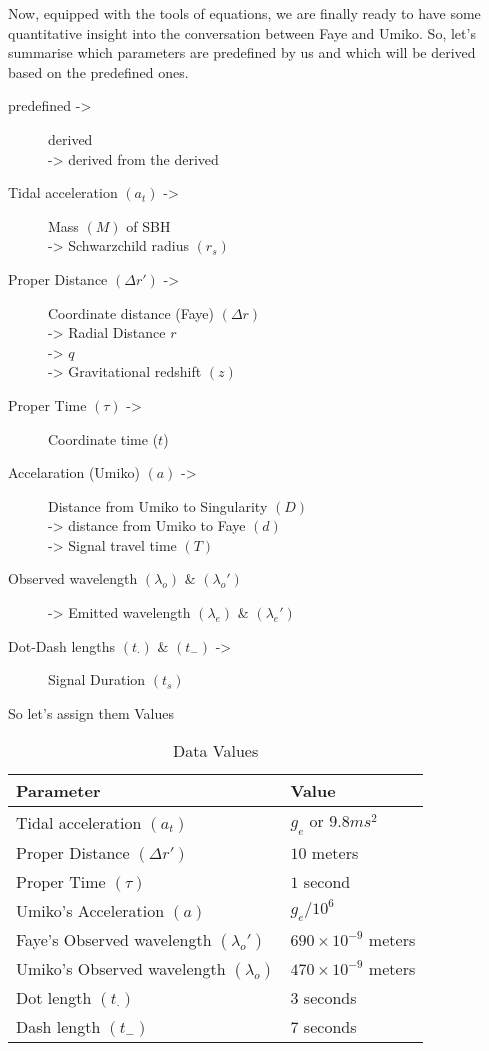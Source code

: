 \documentclass[9pt,a4paper,twocolumn,twoside]{tau-class/tau}
\begin{document}
  Now, equipped with the tools of equations, we are finally ready to have some quantitative insight into the conversation between Faye and Umiko. So, let's summarise which parameters are predefined by us and which will be derived based on the predefined ones.

  \begin{description}
    \item[predefined ->] derived \\-> derived from the derived
    \item[Tidal acceleration \((a_t)\) ->] Mass \((M)\) of SBH \\-> Schwarzchild radius \((r_s)\)
    \item[Proper Distance \((\Delta r')\) ->]  Coordinate distance (Faye) \((\Delta r)\) \\-> Radial Distance \(r\)  \\-> \(q\) \\-> Gravitational redshift \((z)\)
    \item[Proper Time \((\tau)\) ->] Coordinate time (\(t\))
    \item[Accelaration (Umiko) \((a)\) ->] Distance from Umiko to Singularity \((D)\) \\-> distance from Umiko to Faye \((d)\) \\-> Signal travel time \((T)\)
    \item[Observed wavelength \((\lambda_o)\) \& \((\lambda_{o}')\)] ->  Emitted wavelength \((\lambda_{e})\) \& \((\lambda_{e}')\)
    \item[Dot-Dash lengths \((t_{\cdot})\) \& \((t_{-})\) ->]  Signal Duration \((t_s)\) 
  \end{description}

  So let's assign them Values

  \begin{table}[H]
    \centering
    \caption{Data Values}
    \label{tab:table}
    \begin{tabular}{ll}
        \toprule
        \textbf{Parameter} & \textbf{Value} \\
        \midrule
        Tidal acceleration \((a_t)\) & \(g_e\) or \(9.8 ms^2\) \\
        Proper Distance \((\Delta r')\) & \(10\) meters \\
        Proper Time \((\tau)\) & \(1\) second \\
        Umiko's Acceleration \((a)\) & \(g_e / 10^{6}\) \\
        Faye's Observed wavelength \((\lambda_{o}')\) & \(690 \times 10^{-9}\) meters \\
        Umiko's Observed wavelength \((\lambda_{o})\) &  \(470 \times 10^{-9}\) meters\\
        Dot length \((t_{\cdot})\) & \(3\) seconds\\
        Dash length \((t_{-})\) & \(7\) seconds \\

        \bottomrule   
    \end{tabular}


\end{table}
\end{document}
